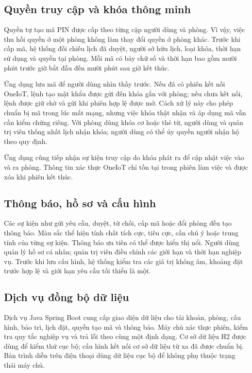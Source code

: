 \subsection{Quyền truy cập và khóa thông minh}

Quyền tự tạo mã PIN được cấp theo từng cặp người dùng và phòng. Vì vậy, việc thu hồi quyền ở một phòng không làm thay đổi quyền ở phòng khác. Trước khi cấp mã, hệ thống đối chiếu lịch đã duyệt, người sở hữu lịch, loại khóa, thời hạn sử dụng và quyền tại phòng. Mỗi mã có bảy chữ số và thời hạn bao gồm mười phút trước giờ bắt đầu đến mười phút sau giờ kết thúc.

Ứng dụng lưu mã để người dùng nhìn thấy trước. Nếu đã có phiên kết nối OneIoT, lệnh tạo mật khẩu được gửi đến khóa gắn với phòng; nếu chưa kết nối, lệnh được giữ chờ và gửi khi phiên hợp lệ được mở. Cách xử lý này cho phép chuẩn bị mã trong lúc mất mạng, nhưng việc khóa thật nhận và áp dụng mã vẫn cần kiểm chứng riêng. Với phòng dùng khóa cơ hoặc thẻ từ, người dùng và quản trị viên thống nhất lịch nhận khóa; người dùng có thể ủy quyền người nhận hộ theo quy định.

Ứng dụng cũng tiếp nhận sự kiện truy cập do khóa phát ra để cập nhật việc vào và ra phòng. Thông tin xác thực OneIoT chỉ tồn tại trong phiên làm việc và được xóa khi phiên kết thúc.

\subsection{Thông báo, hồ sơ và cấu hình}

Các sự kiện như gửi yêu cầu, duyệt, từ chối, cấp mã hoặc đổi phòng đều tạo thông báo. Màu sắc thể hiện tính chất tích cực, tiêu cực, cần chú ý hoặc trung tính của từng sự kiện. Thông báo ưu tiên có thể được hiển thị nổi. Người dùng quản lý hồ sơ cá nhân; quản trị viên điều chỉnh các giới hạn và thời hạn nghiệp vụ. Trước khi lưu cấu hình, hệ thống kiểm tra các giá trị không âm, khoảng đặt trước hợp lệ và giới hạn yêu cầu tối thiểu là một.

\subsection{Dịch vụ đồng bộ dữ liệu}

Dịch vụ Java Spring Boot cung cấp giao diện dữ liệu cho tài khoản, phòng, cấu hình, bảo trì, lịch đặt, quyền tạo mã và thông báo. Máy chủ xác thực phiên, kiểm tra quy tắc nghiệp vụ và trả lỗi theo cùng một định dạng. Cơ sở dữ liệu H2 được dùng để kiểm thử cục bộ; cấu hình kết nối cơ sở dữ liệu từ xa đã được chuẩn bị. Bản trình diễn trên điện thoại dùng dữ liệu cục bộ để không phụ thuộc trạng thái máy chủ.

